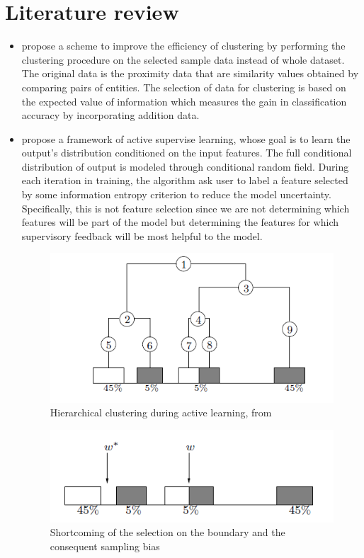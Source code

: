 \documentclass[12pt]{article}
\begin{document}
\section{Literature review}
\begin{itemize}
\item \cite{hofmann_active_1998} propose a scheme to improve the efficiency of clustering by performing the clustering procedure on the selected sample data instead of whole dataset. The original data is the proximity data that are similarity values obtained by comparing pairs of entities. The selection of  data for clustering is based on the expected value of information which measures the gain in  classification accuracy by incorporating addition data. 

\item \cite{druck_active_2009} propose a framework of active supervise learning, whose goal is to learn the output's distribution conditioned on the input features. The full conditional distribution of output is modeled through conditional random field. During each iteration in training, the algorithm ask user to label a feature selected by some information entropy criterion to reduce the model uncertainty. Specifically, this is not feature selection since we are not determining which features will be part of the model but determining the features for which supervisory feedback will be most helpful to the model.

\begin{figure}[H]
	\centering
	\includegraphics[width=0.7\linewidth]{hierarchical}
	\caption{Hierarchical clustering during active learning, from \cite{druck_active_2009}}
	\label{fig:hierarchical}
\end{figure}
\begin{figure}[H]
	\centering
	\includegraphics[width=0.7\linewidth]{hierarchical2}
	\caption{Shortcoming of the selection on the boundary and the consequent sampling bias}
	\label{fig:hierarchical2}
\end{figure}




\end{itemize}
\end{document}
